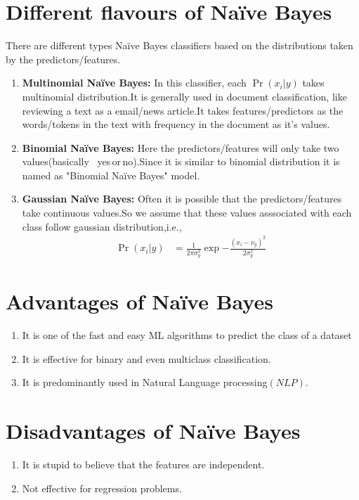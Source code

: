 \documentclass[journal,12pt,onecolumn]{IEEEtran}
\providecommand{\pr}[1]{\ensuremath{\Pr\left(#1\right)}}
\providecommand{\brak}[1]{\ensuremath{\left(#1\right)}}
\theoremstyle{remark}
\numberwithin{equation}{section}
\begin{document}
	    \section{Different flavours of Na\"ive Bayes}\label{1}
	      There are different types Na\"ive Bayes classifiers based on the distributions taken by the predictors/features.
	       \begin{enumerate}
		       \item \textbf{Multinomial Na\"ive Bayes:} In this classifier, each $\pr{x_i|y}$ takes multinomial distribution.It is generally used in document classification, like reviewing a text as a email/news article.It takes features/predictors as the words/tokens in the text with frequency in the document as it's values.
		       \item \textbf{Binomial Na\"ive Bayes:} Here the predictors/features will only take two values(basically \, yes\,or\,no).Since it is similar to binomial distribution it is named as "Binomial Na\"ive Bayes" model.
		       \item \textbf{Gaussian Na\"ive Bayes:} Often it is possible that the predictors/features take continuous values.So we assume that these values asssociated with each class follow gaussian distribution,i.e.,
			       \begin{align}
				       \pr{x_i|y} &= \frac{1}{2\pi\sigma_y^2}\exp{-\frac{\brak{x_i-\nu_y}^2}{2\sigma_y^2}}
			       \end{align}
               \end{enumerate}
	    \section{Advantages of Na\"ive Bayes}
	     \begin{enumerate}
	       \item It is one of the fast and easy ML algorithms to predict the class of a dataset
	       \item It is effective for binary and even multiclass classification.
	       \item It is predominantly used in Natural Language processing$\brak{NLP}$.
	     \end{enumerate}
	    \section{Disadvantages of Na\"ive Bayes}
	      \begin{enumerate}
	       \item It is stupid to believe that the features are independent.
	       \item Not effective for regression problems.
              \end{enumerate}
\end{document}
